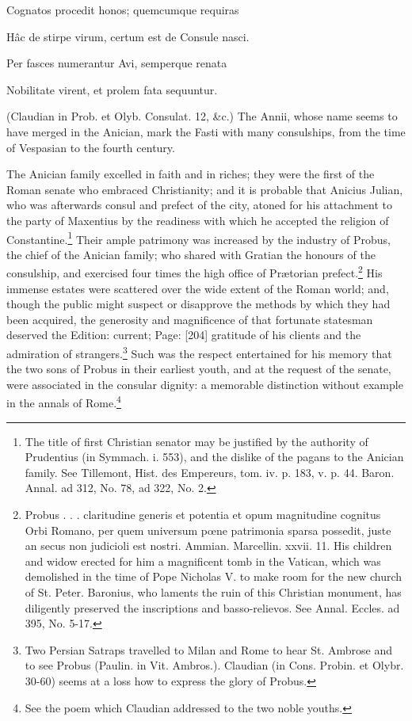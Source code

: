 {Cognatos procedit honos; quemcumque requiras

Hâc de stirpe virum, certum est de Consule nasci.

Per fasces numerantur Avi, semperque renata

Nobilitate virent, et prolem fata sequuntur.

(Claudian in Prob. et Olyb. Consulat. 12, \&c.) The Annii, whose name seems to have merged in the Anician, mark the Fasti with many consulships, from the time of Vespasian to the fourth century.} The Anician family excelled in faith and in riches; they were the first of the Roman senate who embraced Christianity; and it is probable that Anicius Julian, who was afterwards consul and prefect of the city, atoned for his attachment to the party of Maxentius by the readiness with which he accepted the religion of Constantine.\footnote{The title of first Christian senator may be justified by the authority of Prudentius (in Symmach. i. 553), and the dislike of the pagans to the Anician family. See Tillemont, Hist. des Empereurs, tom. iv. p. 183, v. p. 44. Baron. Annal. ad 312, No. 78, ad 322, No. 2.} Their ample patrimony was increased by the industry of Probus, the chief of the Anician family; who shared with Gratian the honours of the consulship, and exercised four times the high office of Prætorian prefect.\footnote{Probus . . . claritudine generis et potentia et opum magnitudine cognitus Orbi Romano, per quem universum pœne patrimonia sparsa possedit, juste an secus non judicioli est nostri. Ammian. Marcellin. xxvii. 11. His children and widow erected for him a magnificent tomb in the Vatican, which was demolished in the time of Pope Nicholas V. to make room for the new church of St. Peter. Baronius, who laments the ruin of this Christian monument, has diligently preserved the inscriptions and basso-relievos. See Annal. Eccles. ad 395, No. 5-17.} His immense estates were scattered over the wide extent of the Roman world; and, though the public might suspect or disapprove the methods by which they had been acquired, the generosity and magnificence of that fortunate statesman deserved the Edition: current; Page: [204] gratitude of his clients and the admiration of strangers.\footnote{Two Persian Satraps travelled to Milan and Rome to hear St. Ambrose and to see Probus (Paulin. in Vit. Ambros.). Claudian (in Cons. Probin. et Olybr. 30-60) seems at a loss how to express the glory of Probus.} Such was the respect entertained for his memory that the two sons of Probus in their earliest youth, and at the request of the senate, were associated in the consular dignity: a memorable distinction without example in the annals of Rome.\footnote{See the poem which Claudian addressed to the two noble youths.}

